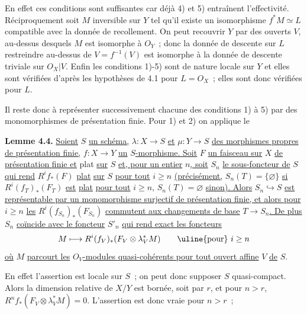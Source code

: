 
En
effet ces conditions sont suffisantes car déjà 4) et 5) entraînent l'effectivité. Réciproquement soit \(M\) inversible sur \(Y\) tel qu'il existe un isomorphisme \(f^*M\simeq L\) compatible avec la donnée de recollement. On peut recouvrir \(Y\) par des ouverts \(V\), au-dessus desquels \(M\) est isomorphe à \({O}_Y\)~; donc la donnée de descente sur \(L\) restreindre au-dessus de \(V=f^{-1}(V)\) est isomorphe à la donnée de descente triviale sur \({O}_X|V\). Enfin les conditions 1)-5) sont de nature locale sur \(Y\) et elles sont vérifiées d'après les hypothèses de 4.1 pour \(L={O}_X\)~; elles sont donc vérifiées pour \(L\).

Il reste donc à représenter successivement chacune des conditions 1) à 5) par des monomorphismes de présentation finie. Pour 1) et 2) on applique le

\textbf{Lemme 4.4.} \uline{Soient} \(S\) \uline{un schéma,} \(\lambda:X\to S\) \uline{et} \(\mu:Y\to S\) \uline{des morphismes propres de présentation finie,} \(f:X\to Y\) \uline{un} \(S\)\uline{-morphisme. Soit} \(F\) \uline{un faisceau sur} \(X\) \uline{de présentation finie et} plat \uline{sur} \(S\) \uline{et, pour un entier} \(n\)\uline{, soit} \(S_n\) \uline{le sous-foncteur de} \(S\) \uline{qui rend} \(R^if_*(F)\) \uline{plat} \uline{sur} \(S\) \uline{pour tout} \(i\ge n\) \uline{(précisément,} \(S_n(T)=\{\varnothing\}\) \uline{si} \(R^i(f_T)_*(F_T)\) \uline{est} \uline{plat} \uline{pour tout} \(i\ge n\), \(S_n(T)=\varnothing\) \uline{sinon). Alors} \(S_n\hookrightarrow S\) \uline{est représentable par un monomorphisme surjectif de présentation finie, et alors pour} \(i\ge n\) \uline{les} \(R^i(f_{S_n})_*(F_{S_n})\) \uline{commutent aux changements de base} \(T\to S_n\)\uline{. De plus} \(S_n\) \uline{coïncide avec le foncteur} \(S'_n\) \uline{qui rend exact les foncteurs}
\[
  M\longmapsto R^i(f_V)_*(F_V\otimes\lambda_V^*M)\qquad \text{\uline{pour} } i\ge n
\]
\uline{où} \(M\) \uline{parcourt les} \({O}_V\)\uline{-modules quasi-cohérents pour tout ouvert affine} \(V\) \uline{de} \(S\).

En effet l'assertion est locale sur \(S\)~; on peut donc supposer \(S\) quasi-compact. Alors la dimension relative de \(X/Y\) est bornée, soit par \(r\), et pour \(n>r\), \(R^nf_*(F_V\otimes\lambda_V^*M)=0\). L'assertion est donc vraie pour \(n>r\)~;

